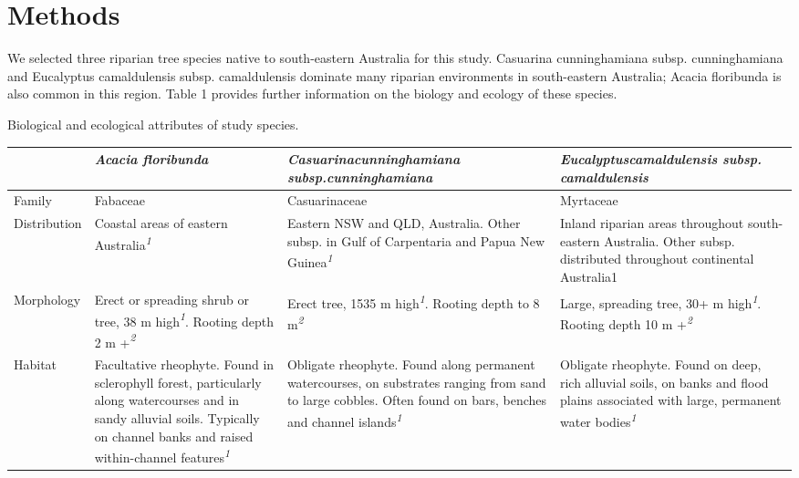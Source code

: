 \documentclass[12pt,a4paper]{memoir}
\begin{document}
\section{Methods}
We selected three riparian tree species native to south-eastern Australia for this study. Casuarina cunninghamiana subsp. cunninghamiana and Eucalyptus camaldulensis subsp. camaldulensis dominate many riparian environments in south-eastern Australia; Acacia floribunda is also common in this region. Table 1 provides further information on the biology and ecology of these species.

\begin{threeparttable}[h!]
\tiny
\centering
\caption[Biological and ecological attributes of study species.]{\small{Biological and ecological attributes of study species.}}
\label{Ch5_T1}
\begin{tabularx}{\textwidth}{XXXX}
\hline
 & {\textit{Acacia floribunda}} & {\textit{Casuarina\newline cunninghamiana subsp.\newline cunninghamiana}} & {\textit{Eucalyptus\newline camaldulensis subsp. camaldulensis}} \\ \hline
Family & Fabaceae & Casuarinaceae & Myrtaceae \\ \hline
Distribution & Coastal areas of eastern Australia\textit{\textsuperscript{1}} & Eastern NSW and QLD, Australia. Other subsp. in Gulf of Carpentaria and Papua New Guinea\textit{\textsuperscript{1}} & Inland riparian areas throughout south-eastern Australia. Other subsp. distributed throughout continental Australia1 \\ \hline
Morphology & Erect or spreading shrub or tree, 38 m high\textit{\textsuperscript{1}}. Rooting depth 2 m +\textit{\textsuperscript{2}} & Erect tree, 1535 m high\textit{\textsuperscript{1}}. Rooting depth to 8 m\textit{\textsuperscript{2}} & Large, spreading tree, 30+ m high\textit{\textsuperscript{1}}. Rooting depth 10 m +\textit{\textsuperscript{2}} \\ \hline
Habitat & Facultative rheophyte. Found in sclerophyll forest, particularly along watercourses and in sandy alluvial soils. Typically on channel banks and raised within-channel features\textit{\textsuperscript{1}} & Obligate rheophyte. Found along permanent watercourses, on substrates ranging from sand to large cobbles. Often found on bars, benches and channel islands\textit{\textsuperscript{1}} & Obligate rheophyte. Found on deep, rich alluvial soils, on banks and flood plains associated with large, permanent water bodies\textit{\textsuperscript{1}} \\ 

\end{tabularx}
\end{threeparttable}
\end{document}
